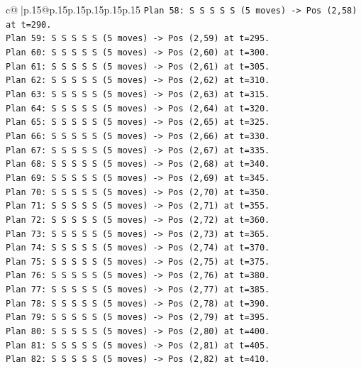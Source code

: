 \documentclass{article}
\begin{document}
{\begin{supertabular}{c@{$\;$}|p{.15\linewidth}@{}p{.15\linewidth}p{.15\linewidth}p{.15\linewidth}p{.15\linewidth}p{.15\linewidth}}
{{{\texttt{Plan 58: S S S S S (5 moves) {-}> Pos (2,58) at t=290.} \\
\texttt{Plan 59: S S S S S (5 moves) {-}> Pos (2,59) at t=295.} \\
\texttt{Plan 60: S S S S S (5 moves) {-}> Pos (2,60) at t=300.} \\
\texttt{Plan 61: S S S S S (5 moves) {-}> Pos (2,61) at t=305.} \\
\texttt{Plan 62: S S S S S (5 moves) {-}> Pos (2,62) at t=310.} \\
\texttt{Plan 63: S S S S S (5 moves) {-}> Pos (2,63) at t=315.} \\
\texttt{Plan 64: S S S S S (5 moves) {-}> Pos (2,64) at t=320.} \\
\texttt{Plan 65: S S S S S (5 moves) {-}> Pos (2,65) at t=325.} \\
\texttt{Plan 66: S S S S S (5 moves) {-}> Pos (2,66) at t=330.} \\
\texttt{Plan 67: S S S S S (5 moves) {-}> Pos (2,67) at t=335.} \\
\texttt{Plan 68: S S S S S (5 moves) {-}> Pos (2,68) at t=340.} \\
\texttt{Plan 69: S S S S S (5 moves) {-}> Pos (2,69) at t=345.} \\
\texttt{Plan 70: S S S S S (5 moves) {-}> Pos (2,70) at t=350.} \\
\texttt{Plan 71: S S S S S (5 moves) {-}> Pos (2,71) at t=355.} \\
\texttt{Plan 72: S S S S S (5 moves) {-}> Pos (2,72) at t=360.} \\
\texttt{Plan 73: S S S S S (5 moves) {-}> Pos (2,73) at t=365.} \\
\texttt{Plan 74: S S S S S (5 moves) {-}> Pos (2,74) at t=370.} \\
\texttt{Plan 75: S S S S S (5 moves) {-}> Pos (2,75) at t=375.} \\
\texttt{Plan 76: S S S S S (5 moves) {-}> Pos (2,76) at t=380.} \\
\texttt{Plan 77: S S S S S (5 moves) {-}> Pos (2,77) at t=385.} \\
\texttt{Plan 78: S S S S S (5 moves) {-}> Pos (2,78) at t=390.} \\
\texttt{Plan 79: S S S S S (5 moves) {-}> Pos (2,79) at t=395.} \\
\texttt{Plan 80: S S S S S (5 moves) {-}> Pos (2,80) at t=400.} \\
\texttt{Plan 81: S S S S S (5 moves) {-}> Pos (2,81) at t=405.} \\
\texttt{Plan 82: S S S S S (5 moves) {-}> Pos (2,82) at t=410.} \\
}}}
\end{supertabular}}
\end{document}
